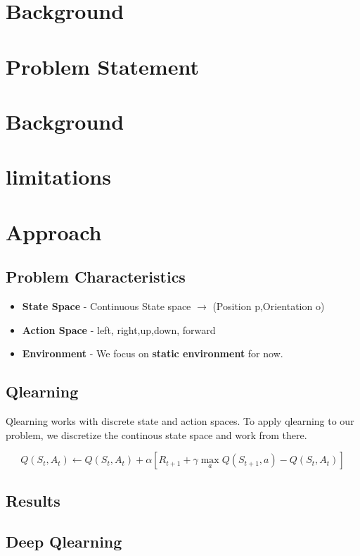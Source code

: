 \documentclass[10pt]{article}
\begin{document}
\section{Background}
\section{Problem Statement}
\section{Background}
\section{limitations}
\section{Approach}
\subsection{Problem Characteristics}
\begin{itemize} 
  \item \textbf{State Space} -  Continuous State space $\rightarrow$ (Position p,Orientation o)
  \item \textbf{Action Space} - left, right,up,down, forward 
  \item \textbf{Environment} - We focus on \textbf{static environment} for now.
\end{itemize}
\subsection{Qlearning}
Qlearning works with discrete state and action spaces. To apply qlearning to our problem, we discretize the continous state space 
and work from there. 

\begin{equation}
  Q(S_t,A_t) \leftarrow Q(S_t,A_t) + \alpha[R_{t+1}+\gamma \max\limits_a Q(S_{t+1},a)- Q(S_t,A_t)]
\end{equation}

\subsection{Results}
\subsection{Deep Qlearning}
\end{document}
